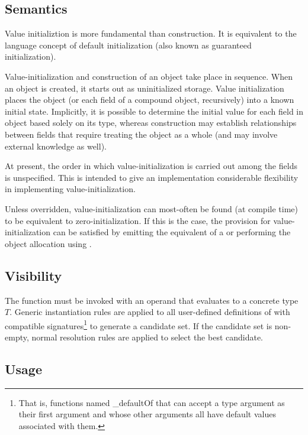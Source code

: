 \subsection{Semantics}

Value initializtion is more fundamental than construction.  It is equivalent to
the language concept of default initialization (also known as guaranteed
initialization).  

Value-initialization and construction of an object take place in sequence.  When
an object is created, it starts out as uninitialized storage.  Value
initialization places the object (or each field of a compound object,
recursively) into a known initial state.  Implicitly, it is possible to
determine the initial value for each field in object based solely on its type, whereas
construction may establish relationships between fields that require treating
the object as a whole (and may involve external knowledge as well).

\begin{note}
At present, the order in which value-initialization is carried out among the
fields is unspecified.  This is intended to give an implementation considerable
flexibility in implementing value-initialization.

Unless overridden, value-initialization can most-often be found (at compile
time) to be equivalent to zero-initialization.  If this is the case, the
provision for value-initialization can be satisfied by emitting the equivalent
of a  or performing the object allocation using .
\end{note}

\subsection{Visibility}

The  function must be invoked with an operand that evaluates
to a concrete type $T$.  Generic instantiation rules are applied to all
user-defined definitions of  with compatible
signatures\footnote{That is, functions named _defaultOf that can accept a type
  argument as their first argument and whose other arguments all have default
  values associated with them.} to generate a candidate set.  If the candidate
set is non-empty, normal resolution rules are applied to select the best
candidate.

\subsection{Usage}

